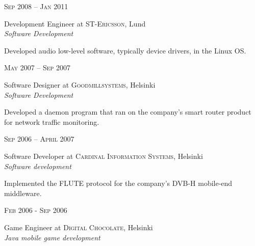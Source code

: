 \documentclass[10pt]{article} %
\begin{document}
{\begin{minipage}[t]{0.44\textwidth}

{\raggedleft\textsc{Sep 2008 -- Jan 2011}\par}

{\raggedright\large Development Engineer at \textsc{ST-Ericsson}, Lund\\
  \textit{Software Development}\\[5pt]}

\normalsize{Developed audio low-level software, typically device
  drivers, in the Linux OS.}\\


{\raggedleft\textsc{May 2007 -- Sep 2007}\par}

{\raggedright\large Software Designer at \textsc{Goodmillsystems}, Helsinki\\
  \textit{Software Development}\\[5pt]}

\normalsize{Developed a daemon program that ran on the company's
  smart router product for network traffic monitoring.}\\


{\raggedleft\textsc{Sep 2006 -- April 2007}\par}

{\raggedright\large Software Developer at \textsc{Cardinal Information
    Systems}, Helsinki\\
  \textit{Software development}\\[5pt]}

\normalsize{Implemented the FLUTE protocol for the company's DVB-H mobile-end
  middleware.}\\

{\raggedleft\textsc{Feb 2006 - Sep 2006}\par}

{\raggedright\large Game Engineer at \textsc{Digital Chocolate}, Helsinki\\
  \textit{Java  mobile game development}\\[5pt]}


\end{minipage}}
\end{document}

